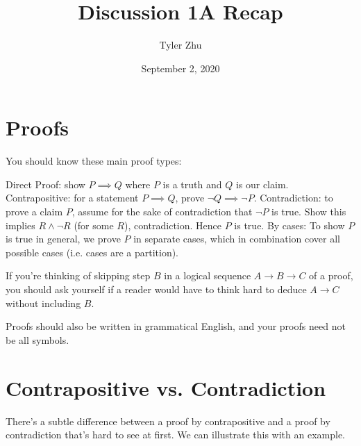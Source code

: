 \documentclass[11 pt]{scrartcl}
\newcommand{\hwtitle}{Discussion 1A Recap}
\begin{document}
 
\title{\Large \hwtitle{}}
\author{\large Tyler Zhu}
\date{\large September 2, 2020}

\maketitle 

\section{Proofs}
You should know these main proof types:
\begin{itemize}
    \ii Direct Proof: show $P\implies Q$ where $P$ is a truth and $Q$ is our claim. 
    \ii Contrapositive: for a statement $P\implies Q$, prove $\neg Q \implies \neg P$. 
    \ii Contradiction: to prove a claim $P$, assume for the sake of contradiction that $\neg P$ is true. Show this implies $R\wedge \neg R$ (for some $R$), contradiction. Hence $P$ is true. 
    \ii By cases: To show $P$ is true in general, we prove $P$ in separate cases, which in combination cover all possible cases (i.e. cases are a partition). 
\end{itemize}

If you're thinking of skipping step $B$ in a logical sequence $A\to B\to C$ of a proof, you should ask yourself if a reader would have to think hard to deduce $A\to C$ without including $B$. 

Proofs should also be written in grammatical English, and your proofs need not be all symbols.

\section{Contrapositive vs. Contradiction}
There's a subtle difference between a proof by contrapositive and a proof by contradiction that's hard to see at first. We can illustrate this with an example. 
\end{document}
